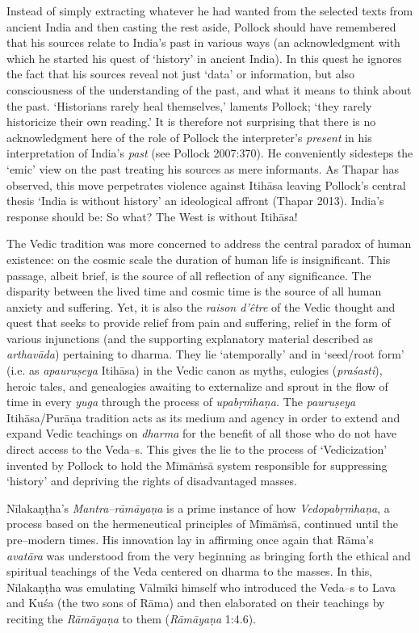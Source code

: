 Instead of simply extracting whatever he had wanted from the selected texts from ancient India and then casting the rest aside, Pollock should have remembered that his sources relate to India’s past in various ways (an acknowledgment with which he started his quest of ‘history’ in ancient India). In this quest he ignores the fact that his sources reveal not just ‘data’ or information, but also consciousness of the understanding of the past, and what it means to think about the past. ‘Historians rarely heal themselves,’ laments Pollock; ‘they rarely historicize their own reading.’ It is therefore not surprising that there is no acknowledgment here of the role of Pollock the interpreter’s \textit{present} in his interpretation of India’s \textit{past} (see Pollock 2007:370). He conveniently sidesteps the ‘emic’ view on the past treating his sources as mere informants. As Thapar has observed, this move perpetrates violence against Itihāsa leaving Pollock’s central thesis ‘India is without history’ an ideological affront (Thapar 2013). India’s response should be: So what? The West is without Itihāsa!

The Vedic tradition was more concerned to address the central paradox of human existence: on the cosmic scale the duration of human life is insignificant. This passage, albeit brief, is the source of all reflection of any significance. The disparity between the lived time and cosmic time is the source of all human anxiety and suffering. Yet, it is also the \textit{raison d'être} of the Vedic thought and quest that seeks to provide relief from pain and suffering, relief in the form of various injunctions (and the supporting explanatory material described as \textit{arthavāda}) pertaining to dharma. They lie ‘atemporally’ and in ‘seed/root form’ (i.e. as \textit{apauruṣeya} Itihāsa) in the Vedic canon as myths, eulogies (\textit{praśasti}), heroic tales, and genealogies awaiting to externalize and sprout in the flow of time in every \textit{yuga} through the process of \textit{upabṛṁhaṇa.} The \textit{pauruṣeya} Itihāsa/Purāṇa tradition acts as its medium and agency in order to extend and expand Vedic teachings on \textit{dharma} for the benefit of all those who do not have direct access to the Veda–s. This gives the lie to the process of ‘Vedicization’ invented by Pollock to hold the Mīmāṁsā system responsible for suppressing ‘history’ and depriving the rights of disadvantaged masses.

Nīlakaṇṭha's \textit{Mantra–rāmāyaṇa} is a prime instance of how \textit{Vedopabṛṁhaṇa}, a process based on the hermeneutical principles of Mīmāṁsā, continued until the pre–modern times. His innovation lay in affirming once again that Rāma's \textit{avatāra} was understood from the very beginning as bringing forth the ethical and spiritual teachings of the Veda centered on dharma to the masses. In this, Nīlakaṇṭha was emulating Vālmīki himself who introduced the Veda–s to Lava and Kuśa (the two sons of Rāma) and then elaborated on their teachings by reciting the \textit{Rāmāyaṇa} to them (\textit{Rāmāyaṇa} 1:4.6).


